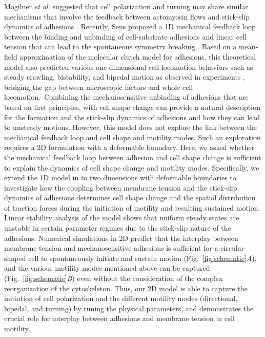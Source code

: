\documentclass[12pt]{article}
\begin{document}
Mogilner \textit{et al.} suggested that cell polarization and turning may share similar mechanisms that involve the feedback between actomyosin flows and stick-slip dynamics of adhesions \cite{mogilner2020experiment}. 
Recently, Sens proposed a 1D mechanical feedback loop between the binding and unbinding of cell-substrate adhesions and linear cell tension that can lead to the spontaneous symmetry breaking \cite{sens2020stick}. 
Based on a mean-field approximation of the molecular clutch model for adhesions, this theoretical model also predicted various one-dimensional cell locomotion behaviors such as steady crawling, bistability, and bipedal motion as observed in experiments \cite{barnhart2010bipedal,loosley2012stick}, bridging the gap between microscopic factors and whole cell locomotion.\ 
Combining the mechanosensitive unbinding of adhesions \cite{sens2020stick} that are based on first principles, with cell shape change can provide a natural description for the formation and the stick-slip dynamics of adhesions and how they can lead to unsteady motions. 
However, this model does not explore the link between the mechanical feedback loop and cell shape and motility modes. 
Such an exploration requires a 2D formulation with a deformable boundary.
Here, we asked whether the mechanical feedback loop between adhesion and cell shape change is sufficient to explain the dynamics of cell shape change and motility modes. 
Specifically, we extend the 1D model in \cite{sens2020stick} to two dimensions with deformable boundaries to investigate how the coupling between membrane tension and the stick-slip dynamics of adhesions determines cell shape change and the spatial distribution of traction forces during the initiation of motility and resulting sustained motion. 
Linear stability analysis of the model shows that uniform steady states are unstable in certain parameter regimes due to the stick-slip nature of the adhesions.
Numerical simulations in 2D predict that the interplay between membrane tension and mechanosensitive adhesions is sufficient for a circular-shaped cell to spontaneously initiate and sustain motion  (Fig.~\ref{fig:schematic}\textit{A}), and the various motility modes mentioned above can be captured (Fig.~\ref{fig:schematic}\textit{B}) even without the consideration of the complex reorganization of the cytoskeleton. 
Thus, our 2D model is able to capture the initiation of cell polarization and the different motility modes (directional, bipedal, and turning) by tuning the physical parameters, and demonstrates the crucial role for interplay between adhesions and membrane tension in cell motility. 
\end{document}
